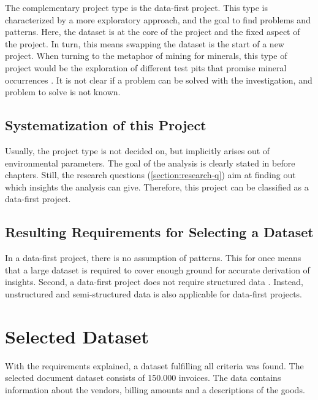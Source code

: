 	The complementary project type is the data-first project. This type is characterized by a more exploratory approach, and the goal to find problems and patterns. Here, the dataset is at the core of the project and the fixed aspect of the project. In turn, this means swapping the dataset is the start of a new project. When turning to the metaphor of mining for minerals, this type of project would be the exploration of different test pits that promise mineral occurrences \cite[p.~3051]{dataScienceProjectTypes}. It is not clear if a problem can be solved with the investigation, and problem to solve is not known.
	
	\subsection{Systematization of this Project}
	Usually, the project type is not decided on, but implicitly arises out of environmental parameters. The goal of the analysis is clearly stated in before chapters. Still, the research questions (\ref{section:research-q}) aim at finding out which insights the analysis can give. Therefore, this project can be classified as a data-first project.
	
	\subsection{Resulting Requirements for Selecting a Dataset}
	In a data-first project, there is no assumption of patterns. This for once means that a large dataset is required to cover enough ground for accurate derivation of insights. Second, a data-first project does not require structured data \cite{srivastavaDataMining}. Instead, unstructured and semi-structured data is also applicable for data-first projects.
	
	
	\section{Selected Dataset}
	With the requirements explained, a dataset fulfilling all criteria was found. The selected document dataset consists of 150.000 invoices. The data contains information about the vendors, billing amounts and a descriptions of the goods. 
	
	
